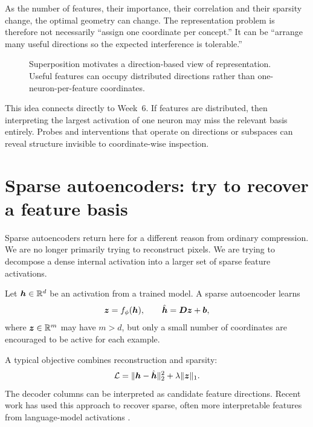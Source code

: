 As the number of features, their importance, their correlation and their sparsity change, the optimal geometry can change. The representation problem is therefore not necessarily ``assign one coordinate per concept.'' It can be ``arrange many useful directions so the expected interference is tolerable.''

\begin{figure}[ht]
  \caption{Superposition motivates a direction-based view of representation. Useful features can occupy distributed directions rather than one-neuron-per-feature coordinates.}
  \label{fig:week10-superposition}
\end{figure}

This idea connects directly to Week~6. If features are distributed, then interpreting the largest activation of one neuron may miss the relevant basis entirely. Probes and interventions that operate on directions or subspaces can reveal structure invisible to coordinate-wise inspection.

\section{Sparse autoencoders: try to recover a feature basis}

Sparse autoencoders return here for a different reason from ordinary compression. We are no longer primarily trying to reconstruct pixels. We are trying to decompose a dense internal activation into a larger set of sparse feature activations.

Let \(\bm{h}\in\mathbb{R}^d\) be an activation from a trained model. A sparse autoencoder learns
\[
  \bm{z}=f_\phi(\bm{h}),
  \qquad
  \hat{\bm{h}}=\bm{D}\bm{z}+\bm{b},
\]
where \(\bm{z}\in\mathbb{R}^m\) may have \(m>d\), but only a small number of coordinates are encouraged to be active for each example.

A typical objective combines reconstruction and sparsity:
\begin{equation}
  \mathcal{L}
  = \lVert \bm{h}-\hat{\bm{h}}\rVert_2^2
    + \lambda \lVert\bm{z}\rVert_1.
  \label{eq:week10-sae}
\end{equation}
The decoder columns can be interpreted as candidate feature directions. Recent work has used this approach to recover sparse, often more interpretable features from language-model activations \parencite{cunningham2023}.

